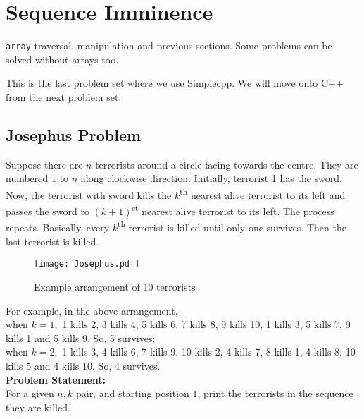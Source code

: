 \section{Sequence Imminence}{\label{sec:sequences}}
\begin{topics}
\verb!array! traversal, manipulation and previous sections. Some problems can be solved without arrays too.
\end{topics}
\begin{note}
	This is the last problem set where we use Simplecpp. We will move onto C++ from the next problem set.
\end{note}
\subsection{Josephus Problem}
Suppose there are $n$ terrorists around a circle facing towards the centre. They are numbered $1$ to $n$ along clockwise direction. Initially, terrorist 1 has the sword. Now, the terrorist with sword kills the $k$\textsuperscript{th} nearest alive terrorist to its left and passes the sword to $(k+1)$\textsuperscript{st} nearest alive terrorist to its left. The process repeats. Basically, every $k$\textsuperscript{th} terrorist is killed until only one survives. Then the last terrorist is killed.
\begin{figure}[H]
    \centering
    \texttt{[image: Josephus.pdf]}
    \caption{Example arrangement of 10 terrorists}
    \label{fig:jp}
\end{figure}
\vspace{-1.5em}
For example, in the above arrangement,\\
when $k=1,$ 1 kills 2, 3 kills 4, 5 kills 6, 7 kills 8, 9 kills 10, 1 kills 3, 5 kills 7, 9 kills 1 and 5 kills 9. So, 5 survives;\\%
when $k=2,$ 1 kills 3, 4 kills 6, 7 kills 9, 10 kills 2, 4 kills 7, 8 kills 1, 4 kills 8, 10 kills 5 and 4 kills 10. So, 4 survives.\\%
\textbf{Problem Statement:}\\
For a given $n, k$ pair, and starting position $1$, print the terrorists in the sequence they are killed.
